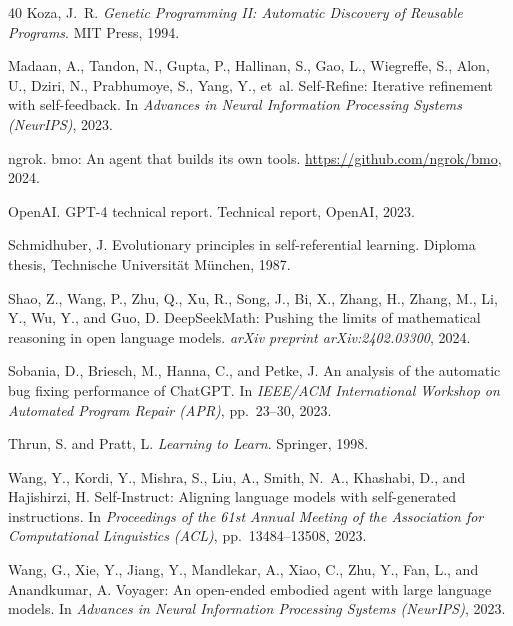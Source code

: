 \begin{thebibliography}{40}
Koza, J.~R.
\newblock \textit{Genetic Programming II: Automatic Discovery of Reusable
  Programs}.
\newblock MIT Press, 1994.

Madaan, A., Tandon, N., Gupta, P., Hallinan, S., Gao, L., Wiegreffe, S.,
  Alon, U., Dziri, N., Prabhumoye, S., Yang, Y., et~al.
\newblock Self-Refine: Iterative refinement with self-feedback.
\newblock In \textit{Advances in Neural Information Processing Systems
  (NeurIPS)}, 2023.

ngrok.
\newblock bmo: An agent that builds its own tools.
\newblock \url{https://github.com/ngrok/bmo}, 2024.

OpenAI.
\newblock GPT-4 technical report.
\newblock Technical report, OpenAI, 2023.

Schmidhuber, J.
\newblock Evolutionary principles in self-referential learning.
\newblock Diploma thesis, Technische Universit{\"a}t M{\"u}nchen, 1987.

Shao, Z., Wang, P., Zhu, Q., Xu, R., Song, J., Bi, X., Zhang, H., Zhang, M.,
  Li, Y., Wu, Y., and Guo, D.
\newblock DeepSeekMath: Pushing the limits of mathematical reasoning in open
  language models.
\newblock \textit{arXiv preprint arXiv:2402.03300}, 2024.

Sobania, D., Briesch, M., Hanna, C., and Petke, J.
\newblock An analysis of the automatic bug fixing performance of ChatGPT.
\newblock In \textit{IEEE/ACM International Workshop on Automated Program
  Repair (APR)}, pp.\ 23--30, 2023.

Thrun, S. and Pratt, L.
\newblock \textit{Learning to Learn}.
\newblock Springer, 1998.

Wang, Y., Kordi, Y., Mishra, S., Liu, A., Smith, N.~A., Khashabi, D., and
  Hajishirzi, H.
\newblock Self-Instruct: Aligning language models with self-generated
  instructions.
\newblock In \textit{Proceedings of the 61st Annual Meeting of the Association
  for Computational Linguistics (ACL)}, pp.\ 13484--13508, 2023.

Wang, G., Xie, Y., Jiang, Y., Mandlekar, A., Xiao, C., Zhu, Y., Fan, L., and
  Anandkumar, A.
\newblock Voyager: An open-ended embodied agent with large language models.
\newblock In \textit{Advances in Neural Information Processing Systems
  (NeurIPS)}, 2023.


\end{thebibliography}
